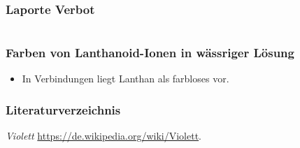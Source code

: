 \documentclass{beamer}
\begin{document}
  \begin{frame}[t]\frametitle{Laporte Verbot}

\end{frame}
\section{}
  \begin{frame}[t]\frametitle{Farben von Lanthanoid-Ionen in wässriger Lösung}
\begin{itemize}
  \item In Verbindungen liegt Lanthan als farbloses  vor.
\end{itemize}

\end{frame}


\begin{frame}[t]\frametitle{Literaturverzeichnis}
    

\begin{thebibliography}{9}

\emph{Violett}
 \url{https://de.wikipedia.org/wiki/Violett}.

\end{thebibliography}
  


\end{frame}


\end{document}
